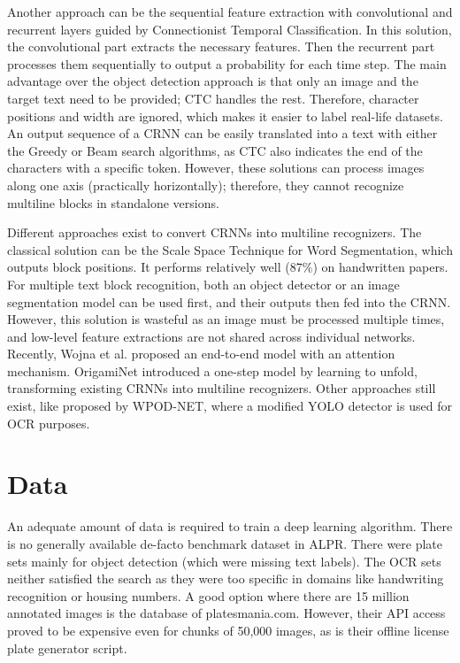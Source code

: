 Another approach can be the sequential feature extraction with convolutional and recurrent layers guided by Connectionist Temporal Classification\cite{CTC}. In this solution, the convolutional part extracts the necessary features. Then the recurrent part processes them sequentially to output a probability for each time step. The main advantage over the object detection approach is that only an image and the target text need to be provided; CTC handles the rest. Therefore, character positions and width are ignored, which makes it easier to label real-life datasets. An output sequence of a CRNN can be easily translated into a text with either the Greedy or Beam search algorithms, as CTC also indicates the end of the characters with a specific token. However, these solutions can process images along one axis (practically horizontally); therefore, they cannot recognize multiline blocks in standalone versions.

Different approaches exist to convert CRNNs into multiline recognizers. The classical solution can be the Scale Space Technique for Word Segmentation\cite{ScaleWordSeg}, which outputs block positions. It performs relatively well (87\%) on handwritten papers. For multiple text block recognition, both an object detector or an image segmentation model can be used first, and their outputs then fed into the CRNN. However, this solution is wasteful as an image must be processed multiple times, and low-level feature extractions are not shared across individual networks. Recently, Wojna et al.\cite{Attention-basedExtract} proposed an end-to-end model with an attention mechanism. OrigamiNet\cite{OrigamiNet} introduced a one-step model by learning to unfold, transforming existing CRNNs into multiline recognizers. Other approaches still exist, like proposed by WPOD-NET\cite{WPOD-NET}, where a modified YOLO detector is used for OCR purposes.

\section{Data}

An adequate amount of data is required to train a deep learning algorithm. There is no generally available de-facto benchmark dataset in ALPR. There were plate sets mainly for object detection (which were missing text labels). The OCR sets neither satisfied the search as they were too specific in domains like handwriting recognition or housing numbers. A good option where there are 15 million annotated images is the database of platesmania.com\cite{PlatesMania}. However, their API access proved to be expensive even for chunks of 50,000 images, as is their offline license plate generator script.

